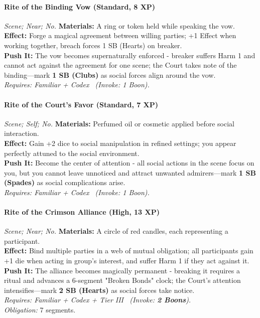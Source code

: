 \paragraph{Rite of the Binding Vow (Standard, 8 XP)} \emph{Scene; Near; No.}
\textbf{Materials:} A ring or token held while speaking the vow. \\
\textbf{Effect:} Forge a magical agreement between willing parties; +1 Effect when working together, breach forces 1 SB (Hearts) on breaker. \\
\textbf{Push It:} The vow becomes supernaturally enforced - breaker suffers Harm 1 and cannot act against the agreement for one scene; the Court takes note of the binding—mark \textbf{1 SB (Clubs)} as social forces align around the vow. \\
\emph{Requires: Familiar + Codex \ (\textit{Invoke:} 1 Boon).}

\paragraph{Rite of the Court's Favor (Standard, 7 XP)} \emph{Scene; Self; No.}
\textbf{Materials:} Perfumed oil or cosmetic applied before social interaction. \\
\textbf{Effect:} Gain +2 dice to social manipulation in refined settings; you appear perfectly attuned to the social environment. \\
\textbf{Push It:} Become the center of attention - all social actions in the scene focus on you, but you cannot leave unnoticed and attract unwanted admirers—mark \textbf{1 SB (Spades)} as social complications arise. \\
\emph{Requires: Familiar + Codex \ (\textit{Invoke:} 1 Boon).}

\paragraph{Rite of the Crimson Alliance (High, 13 XP)} \emph{Scene; Near; No.}
\textbf{Materials:} A circle of red candles, each representing a participant. \\
\textbf{Effect:} Bind multiple parties in a web of mutual obligation; all participants gain +1 die when acting in group's interest, and suffer Harm 1 if they act against it. \\
\textbf{Push It:} The alliance becomes magically permanent - breaking it requires a ritual and advances a 6-segment "Broken Bonds" clock; the Court's attention intensifies—mark \textbf{2 SB (Hearts)} as social forces take notice. \\
\emph{Requires: Familiar + Codex + Tier III \ (\textit{Invoke:} \textbf{2 Boons}).} \\
\emph{Obligation:} 7 segments.

